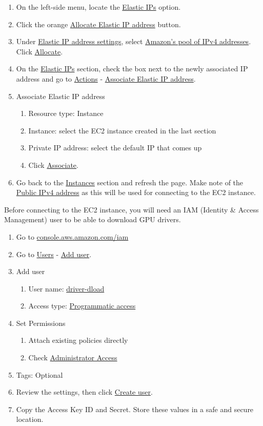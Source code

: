 \documentclass[titlepage, 12pt]{article}
\begin{document}
	\begin{enumerate}
	\item{On the left-side menu, locate the \underline{Elastic IPs} option.}
	\item{Click the orange \underline{Allocate Elastic IP address} button.}
	\item{Under \underline{Elastic IP address settings}, select \underline{Amazon’s pool of IPv4 addresses}. Click \underline{Allocate}.}
	\item{On the \underline{Elastic IPs} section, check the box next to the newly associated IP address and go to \underline{Actions} - \underline{Associate Elastic IP address}.}
	\item{Associate Elastic IP address}
		\begin{enumerate}
		\item{Resource type: Instance}
		\item{Instance: select the EC2 instance created in the last section}
		\item{Private IP address: select the default IP that comes up}
		\item{Click \underline{Associate}.}
		\end{enumerate}
	\item{Go back to the \underline{Instances} section and refresh the page. Make note of the \underline{Public IPv4 address} as this will be used for connecting to the EC2 instance.}
	\end{enumerate}

	Before connecting to the EC2 instance, you will need an IAM (Identity \& Access Management) user to be able to download GPU drivers. 

	\begin{enumerate}
	\item{Go to \underline{console.aws.amazon.com/iam}}
	\item{Go to \underline{Users} - \underline{Add user}.}
	\item{Add user}
		\begin{enumerate}
		\item{User name: \underline{driver-dload}}
		\item{Access type: \underline{Programmatic access}}
		\end{enumerate}
	\item{Set Permissions}
		\begin{enumerate}
		\item{Attach existing policies directly}
		\item{Check \underline{Administrator Access}}
		\end{enumerate}
	\item{Tags: Optional}
	\item{Review the settings, then click \underline{Create user}.}
	\item{Copy the Access Key ID and Secret. Store these values in a safe and secure location.}
	\end{enumerate}
\end{document}
